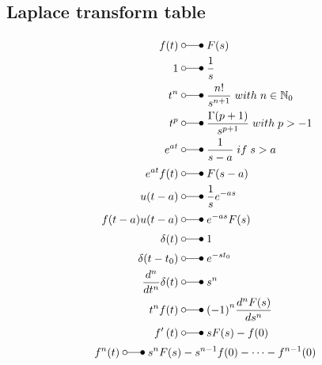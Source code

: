 \subsection{Laplace transform table}
\begin{align*}
    f(t)                            \;                      & \laplace\; F(s)                                                     \\
    1                               \;                      & \laplace\; \frac{1}{s}                                              \\
    t^{n}                           \;                      & \laplace\; \frac{n!}{s^{n+1}} \; with \; n \in \mathbb{N}_0         \\
    t^{p}                           \;                      & \laplace\; \frac{\Gamma(p+1)}{s^{p+1}} \; with \; p > -1            \\
    e^{at}                          \;                      & \laplace\; \frac{1}{s-a} \; if \; s>a \;                            \\
    e^{at}f(t)                      \;                      & \laplace\; F(s-a)                                                   \\
    u(t-a)                          \;                      & \laplace\; \frac{1}{s}e^{-as}                                       \\
    f(t-a)u(t-a)                    \;                      & \laplace\; e^{-as}F(s)                                              \\
    \delta(t)                       \;                      & \laplace\; 1                                                        \\
    \delta(t-t_{0})                 \;                      & \laplace\; e^{-st_{0}}                                              \\
    \frac{d^{n}}{dt^{n}}\delta(t)   \;                      & \laplace\; s^{n}                                                    \\
    t^{n}f(t)                       \;                      & \laplace\; {(-1)}^n \frac{d^{n}F(s)}{ds^n}                          \\
    f^{\prime}\left(t\right)        \;                      & \laplace\; \begin{aligned}sF(s)-f(0)\end{aligned}                   \\
    f^{n}(t)                        \; \laplace\; s^{n}F(s) & -s^{n-1}f(0)-\cdots-f^{n-1}(0)                                      \\

\end{align*}
